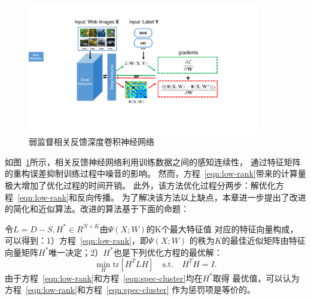 \documentclass[doctor]{ustcthesis}
\begin{document}
\begin{figure}[t]
    \includegraphics[clip=true, width=0.9\textwidth]{rf-cnn-frm}
    \caption{弱监督相关反馈深度卷积神经网络}\label{fig:rf-cnn-frm}
\end{figure}
如图~\ref{fig:rf-cnn-frm}所示，相关反馈神经网络利用训练数据之间的感知连续性，
通过特征矩阵的重构误差抑制训练过程中噪音的影响。
然而，方程~\eqref{eqn:low-rank}带来的计算量极大增加了优化过程的时间开销。
此外，该方法优化过程分两步：解优化方程~\eqref{eqn:low-rank}和反向传播。
为了解决该方法以上缺点，本章进一步提出了改进的简化和近似算法。改进的算法基于下面的命题：
\begin{proposition}\label{prop:lowrank-spec}
    令$L=D-S, H^* \in R^{N\times K}$由$\Psi(X;W)$的K个最大特征值
    对应的特征向量构成，可以得到：1）方程~\eqref{eqn:low-rank}，即$\Psi(X;W)$
    的秩为$K$的最佳近似矩阵由特征向量矩阵$H^*$唯一决定；2）$H^*$也是下列优化方程的最优解：
    \begin{equation}
        \label{eqn:spec-cluster}
        \min_H \text{tr}[H^TLH] \quad \text{s.t.} \quad H^TH = I.
    \end{equation}
    由于方程~\eqref{eqn:low-rank}和方程~\eqref{eqn:spec-cluster}均在$H^*$取得
    最优值，可以认为方程~\eqref{eqn:low-rank}和方程~\eqref{eqn:spec-cluster}
    作为惩罚项是等价的。
\end{proposition}
\end{document}
